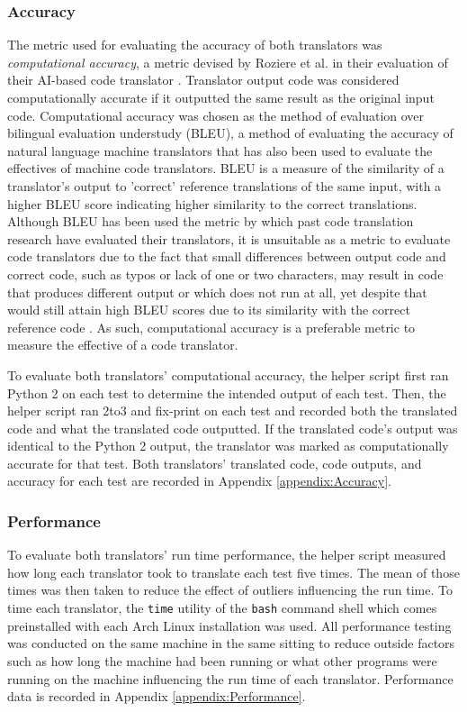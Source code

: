 \subsubsection{Accuracy}
The metric used for evaluating the accuracy of both translators was \textit{computational accuracy}, a metric devised by Roziere et al. in their evaluation of their AI-based code translator \autocite{Roziere}. Translator output code was considered computationally accurate if it outputted the same result as the original input code. Computational accuracy was chosen as the method of evaluation over bilingual evaluation understudy (BLEU), a method of evaluating the accuracy of natural language machine translators that has also been used to evaluate the effectives of machine code translators. BLEU is a measure of the similarity of a translator's output to 'correct' reference translations of the same input, with a higher BLEU score indicating higher similarity to the correct translations. Although BLEU has been used the metric by which past code translation research have evaluated their translators, it is unsuitable as a metric to evaluate code translators due to the fact that small differences between output code and correct code, such as typos or lack of one or two characters, may result in code that produces different output or which does not run at all, yet despite that would still attain high BLEU scores due to its similarity with the correct reference code \autocite{Roziere}. As such, computational accuracy is a preferable metric to measure the effective of a code translator.

To evaluate both translators' computational accuracy, the helper script first ran Python 2 on each test to determine the intended output of each test. Then, the helper script ran 2to3 and fix-print on each test and recorded both the translated code and what the translated code outputted. If the translated code's output was identical to the Python 2 output, the translator was marked as computationally accurate for that test. Both translators' translated code, code outputs, and accuracy for each test are recorded in Appendix \ref{appendix:Accuracy}.

\subsubsection{Performance}
To evaluate both translators' run time performance, the helper script measured how long each translator took to translate each test five times. The mean of those times was then taken to reduce the effect of outliers influencing the run time. To time each translator, the \verb|time| utility of the \verb|bash| command shell which comes preinstalled with each Arch Linux installation was used. All performance testing was conducted on the same machine in the same sitting to reduce outside factors such as how long the machine had been running or what other programs were running on the machine influencing the run time of each translator. Performance data is recorded in Appendix \ref{appendix:Performance}.